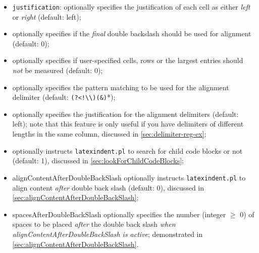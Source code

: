 \documentclass[10pt]{article}
\begin{document}
\begin{itemize}
{        alignment}\texttt{spacesAfterAmpersand}: optionally specifies the number (integer
        $\geq$ 0) of spaces to be placed \emph{After} ampersands (default: 1);
  \item {}\texttt{justification}: optionally specifies the justification of each
        cell as either \emph{left} or \emph{right} (default: left);
  \item {}
        optionally specifies if the \emph{final} double backslash should be used for
        alignment (default: 0);
  \item {} optionally specifies if
        user-specified cells, rows or the largest entries should \emph{not} be measured
        (default: 0);
  \item {} optionally
        specifies the pattern matching to be used for the alignment delimiter (default:
        \lstinline* '(?<!\\)(&)'*);
  \item {} optionally
        specifies the justification for the alignment delimiters (default: left); note
        that this feature is only useful if you have delimiters of different lengths in
        the same column, discussed in \cref{sec:delimiter-reg-ex};
  \item {}
        optionally instructs \texttt{latexindent.pl} to search for child code blocks or
        not (default: 1), discussed in \cref{sec:lookForChildCodeBlocks};
  \item {}
        alignContentAfterDoubleBackSlash optionally instructs \texttt{latexindent.pl} to
        align content \emph{after} double back slash (default: 0), discussed in
        \cref{sec:alignContentAfterDoubleBackSlash};
  \item {}
        spacesAfterDoubleBackSlash optionally specifies the number (integer $\geq$ 0) of
        spaces to be placed \emph{after} the double back slash \emph{when
        alignContentAfterDoubleBackSlash is active}; demonstrated in
        \cref{sec:alignContentAfterDoubleBackSlash}.
 \end{itemize}
\end{document}
